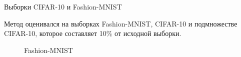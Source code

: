 \documentclass[12pt, aspectratio=169]{beamer}
\begin{document}
\begin{frame}{Выборки CIFAR-10 и  Fashion-MNIST}


Метод оценивался на выборках Fashion-MNIST, CIFAR-10 и подмножестве CIFAR-10, которое составляет 10\% от исходной выборки.
    
\begin{figure}
    \begin{minipage}[h]{0.45\linewidth}
    \vspace{-1 cm}
    \fontsize{10}{5}
    \caption*{CIFAR-10}
    \end{minipage}
    \begin{minipage}[h]{0.45\linewidth}
    \vspace{-1 cm}
    \fontsize{10}{5}
    \caption*{Fashion-MNIST}
    \end{minipage}
\end{figure}


\end{frame}
\end{document}
